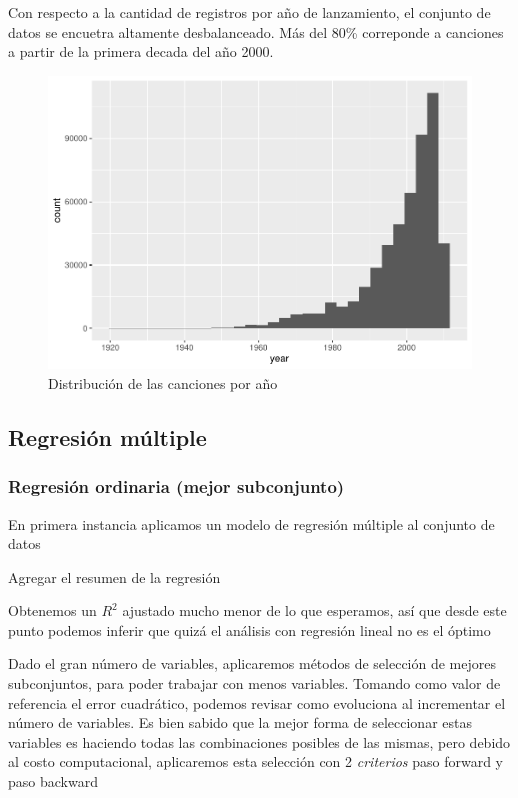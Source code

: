 \documentclass[conference,final,]{IEEEtran}
\begin{document}
Con respecto a la cantidad de registros por año de lanzamiento, el
conjunto de datos se encuetra altamente desbalanceado. Más del 80\%
correponde a canciones a partir de la primera decada del año 2000.

\begin{figure}[H]

{\centering \includegraphics[width=0.6\linewidth]{YearPrediction_Reporte_files/figure-latex/unnamed-chunk-1-1} 

}

\caption{Distribución de las canciones por año}\label{fig:unnamed-chunk-1}
\end{figure}

\hypertarget{regresion-multiple}{%
\subsection{Regresión múltiple}\label{regresion-multiple}}

\hypertarget{regresion-ordinaria-mejor-subconjunto}{%
\subsubsection{Regresión ordinaria (mejor
subconjunto)}\label{regresion-ordinaria-mejor-subconjunto}}

En primera instancia aplicamos un modelo de regresión múltiple al
conjunto de datos

Agregar el resumen de la regresión

Obtenemos un \(R^2\) ajustado mucho menor de lo que esperamos, así que
desde este punto podemos inferir que quizá el análisis con regresión
lineal no es el óptimo

Dado el gran número de variables, aplicaremos métodos de selección de
mejores subconjuntos, para poder trabajar con menos variables. Tomando
como valor de referencia el error cuadrático, podemos revisar como
evoluciona al incrementar el número de variables. Es bien sabido que la
mejor forma de seleccionar estas variables es haciendo todas las
combinaciones posibles de las mismas, pero debido al costo
computacional, aplicaremos esta selección con 2 \emph{criterios} paso
forward y paso backward
\end{document}
